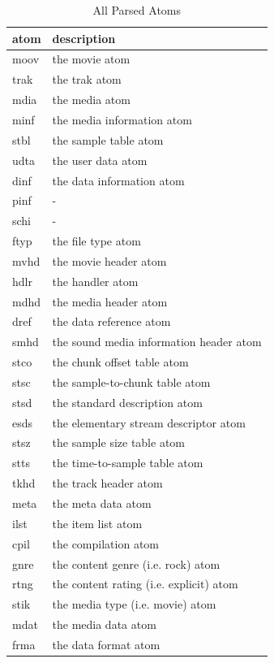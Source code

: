 \documentclass[journal]{vgtc}                %
\begin{document}
\begin{table}[h]
  \caption{All Parsed Atoms}
  \label{tab:atoms}
  \scriptsize%
	\centering%
  \begin{tabu}{l l}
  \toprule
    atom & description \\
  \midrule
    moov & the movie atom \\
    trak & the trak atom \\
    mdia & the media atom \\
    minf & the media information atom \\
    stbl & the sample table atom \\
    udta & the user data atom \\
    dinf & the data information atom \\
    pinf & - \\
    schi & - \\
    ftyp & the file type atom \\
    mvhd & the movie header atom \\
    hdlr & the handler atom \\
    mdhd & the media header atom \\
    dref & the data reference atom \\
    smhd & the sound media information header atom \\
    stco & the chunk offset table atom \\
    stsc & the sample-to-chunk table atom \\
    stsd & the standard description atom \\
    esds & the elementary stream descriptor atom \\
    stsz & the sample size table atom \\
    stts & the time-to-sample table atom \\
    tkhd & the track header atom \\
    meta & the meta data atom \\
    ilst & the item list atom \\
    cpil & the compilation atom \\
    gnre & the content genre (i.e. rock) atom \\
    rtng & the content rating (i.e. explicit) atom \\
    stik & the media type (i.e. movie) atom \\
    mdat & the media data atom \\
    frma & the data format atom \\
  \midrule
  \end{tabu}%
\end{table}
\end{document}
